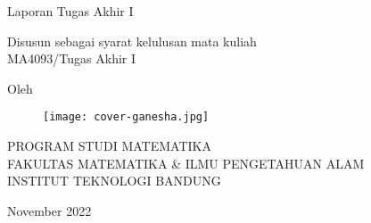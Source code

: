 \clearpage
\pagestyle{empty}

\begin{center}
    \smallskip

    \large \bfseries \MakeUppercase{\thetitle}
    \vfill

    \Large Laporan Tugas Akhir I
    \vfill

    \large Disusun sebagai syarat kelulusan mata kuliah \\
    MA4093/Tugas Akhir I
    \vfill

    \large Oleh

    \Large \theauthor

    \vfill
    \begin{figure}[h]
        \centering
        \texttt{[image: cover-ganesha.jpg]}
    \end{figure}
    \vfill

    \large
    \uppercase{
        Program Studi Matematika \\
        Fakultas Matematika \& Ilmu Pengetahuan Alam \\
        Institut Teknologi Bandung
    }

    November 2022

\end{center}

\clearpage
